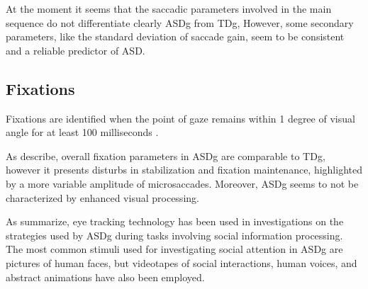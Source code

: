 At the moment it seems that the saccadic parameters involved in the main sequence do not differentiate clearly ASDg from TDg, However, some secondary parameters, like the standard deviation of saccade gain, seem to be consistent and a reliable predictor of ASD.


\subsection{Fixations}
\label{sec:fixationsstheory}

\newline




Fixations are identified when the point of gaze remains within 1 degree of visual angle for at least 100 milliseconds \citep{boraston2007eyetrackingASD}.

As \cite{johnson2016review} describe, overall fixation parameters in ASDg are comparable to TDg, however it presents disturbs in stabilization and fixation maintenance, highlighted by a more variable amplitude of microsaccades. Moreover, ASDg seems to not be characterized by enhanced visual processing.

As \cite{pensiero2009saccades} summarize, eye tracking technology has been used in investigations on the strategies used by ASDg during tasks involving social information processing. The most common stimuli used for investigating social attention in ASDg are pictures of human faces, but videotapes of social interactions, human voices, and abstract animations have also been employed.

